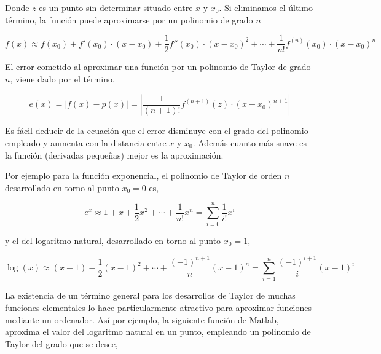 \begin{paracol}{2}
Donde $z$ es un punto sin determinar situado entre $x$  y $x_0$.   Si eliminamos el último término, la función puede aproximarse por un polinomio de grado $n$								
\end{paracol}
\begin{equation*}
f(x)\approx f(x_0)+f'(x_0)\cdot (x-x_0)+\frac{1}{2}f''(x_0)\cdot (x-x_0)^2+\cdots + \frac{1}{n!}f^{(n)}(x_0)\cdot (x-x_0)^n
\end{equation*}
\begin{paracol}{2}
El error cometido al aproximar una función por un polinomio de Taylor de grado $n$, viene dado por el término,
\end{paracol}
\begin{equation*}
e(x)=\lvert f(x) -p(x)\rvert=\left\lvert\frac{1}{(n+1)!} f^{(n+1)}(z)\cdot (x-x_0)^{n+1}\right\rvert
\end{equation*}
\begin{paracol}{2}
Es fácil deducir de la ecuación que el error disminuye con el grado del polinomio empleado y aumenta con la distancia entre $x$ y $x_0$. Además cuanto más suave es la función (derivadas pequeñas) mejor es la aproximación.

Por ejemplo para la función exponencial, el polinomio de Taylor de orden $n$ desarrollado en torno al punto $x_0=0$ es, 
\end{paracol}
\begin{equation*}
e^x\approx 1+x+\frac{1}{2}x^2+\cdots+\frac{1}{n!}x^n=\sum_{i=0}^n\frac{1}{i!}x^i
\end{equation*}
\begin{paracol}{2}
y el del logaritmo natural, desarrollado en torno al punto $x_0=1$, 
\end{paracol}
\begin{equation*}
\log(x)\approx (x-1)-\frac{1}{2}(x-1)^2+\cdots+\frac{(-1)^{n+1}}{n}(x-1)^n=\sum_{i=1}^n\frac{(-1)^{i+1}}{i}(x-1)^i
\end{equation*}
\begin{paracol}{2}
La existencia de un término general para los desarrollos de Taylor de muchas funciones elementales lo hace particularmente atractivo para aproximar funciones mediante un ordenador. Así por ejemplo, la siguiente función de Matlab, aproxima el valor del logaritmo natural en un punto, empleando un polinomio de Taylor del grado que se desee,
\end{paracol}

